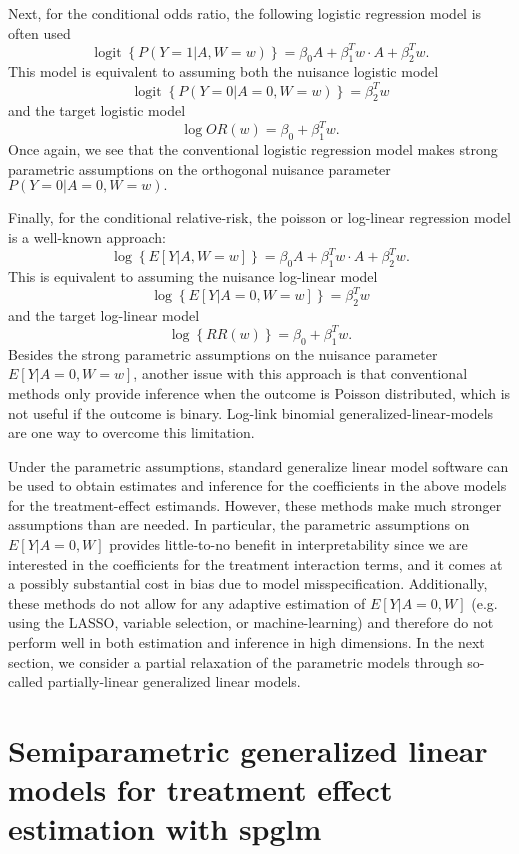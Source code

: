 \documentclass{article}
\DeclareMathOperator{\logit}{logit}
\begin{document}
Next, for the conditional odds ratio, the following logistic regression model is often used
$$\logit \left\{P(Y=1|A,W=w) \right\} =  \beta_0 A +  \beta_1^T w \cdot A + \beta_2^T w.$$
This model is equivalent to assuming both the nuisance logistic model
$$\logit\left\{P(Y=0|A=0,W=w) \right\} =   \beta_2^T w$$
and the target logistic model
$$\log OR(w) =  \beta_0  +  \beta_1^T w. $$
Once again, we see that the conventional logistic regression model makes strong parametric assumptions on the orthogonal nuisance parameter $P(Y=0|A=0,W=w).$ 

Finally, for the conditional relative-risk, the poisson or log-linear regression model is a well-known approach:
$$\log \left\{E[Y|A,W=w] \right\} =  \beta_0 A +  \beta_1^T w \cdot A + \beta_2^T w.$$
This is equivalent to assuming the nuisance log-linear model
$$\log \left\{E[Y|A=0,W=w] \right\} = \beta_2^T w$$
and the target log-linear model
$$\log \left\{RR(w) \right\} =  \beta_0  +  \beta_1^T w. $$
Besides the strong parametric assumptions on the nuisance parameter $E[Y|A=0,W=w]$, another issue with this approach is that conventional methods only provide inference when the outcome is Poisson distributed, which is not useful if the outcome is binary. Log-link binomial generalized-linear-models are one way to overcome this limitation. 

Under the parametric assumptions, standard generalize linear model software can be used to obtain estimates and inference for the coefficients in the above models for the treatment-effect estimands. However, these methods make much stronger assumptions than are needed. In particular, the parametric assumptions on $E[Y|A=0,W]$ provides little-to-no benefit in interpretability since we are interested in the coefficients for the treatment interaction terms, and it comes at a possibly substantial cost in bias due to model misspecification. Additionally, these methods do not allow for any adaptive estimation of $E[Y|A=0,W]$ (e.g. using the LASSO, variable selection, or machine-learning) and therefore do not perform well in both estimation and inference in high dimensions. In the next section, we consider a partial relaxation of the parametric models through so-called partially-linear generalized linear models.




\section{Semiparametric generalized linear models for treatment effect estimation  with spglm}
\end{document}
